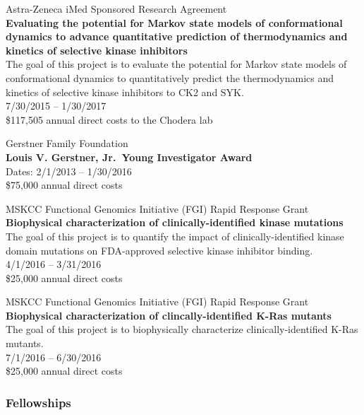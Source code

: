 \documentclass[10pt]{article}
\begin{document}
\vspace{1.5ex}

Astra-Zeneca iMed Sponsored Research Agreement \\
{\bf Evaluating the potential for Markov state models of conformational dynamics to advance quantitative prediction of thermodynamics and kinetics of selective kinase inhibitors} \\
The goal of this project is to evaluate the potential for Markov state models of conformational dynamics to quantitatively predict the thermodynamics and kinetics of selective kinase inhibitors to CK2 and SYK. \\
7/30/2015 -- 1/30/2017 \\
\$117,505 annual direct costs to the Chodera lab

\vspace{1.5ex}

Gerstner Family Foundation \\
{\bf Louis V. Gerstner, Jr.~Young Investigator Award} \\
Dates: 2/1/2013 -- 1/30/2016 \\
\$75,000 annual direct costs

\vspace{1.5ex}

MSKCC Functional Genomics Initiative (FGI) Rapid Response Grant \\
{\bf Biophysical characterization of clinically-identified kinase mutations} \\
The goal of this project is to quantify the impact of clinically-identified kinase domain mutations on FDA-approved selective kinase inhibitor binding. \\
4/1/2016 -- 3/31/2016 \\
\$25,000 annual direct costs

\vspace{1.5ex}

MSKCC Functional Genomics Initiative (FGI) Rapid Response Grant \\
{\bf Biophysical characterization of clincally-identified K-Ras mutants} \\
The goal of this project is to biophysically characterize clinically-identified K-Ras mutants. \\
7/1/2016 -- 6/30/2016 \\
\$25,000 annual direct costs

\subsubsection*{Fellowships}
\end{document}
